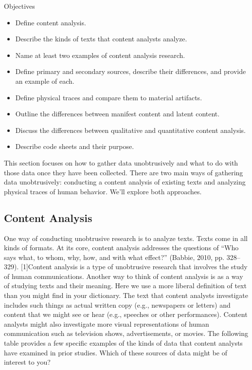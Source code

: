 \begin{center}
	\begin{objbox}{Objectives}
		\begin{itemize}
			\setlength{\itemsep}{0pt}
			\setlength{\parskip}{0pt}
			\setlength{\parsep}{0pt}
			
			\item Define content analysis.
			\item Describe the kinds of texts that content analysts analyze.
			\item Name at least two examples of content analysis research.
			\item Define primary and secondary sources, describe their differences, and provide an example of each.
			\item Define physical traces and compare them to material artifacts.
			\item Outline the differences between manifest content and latent content.
			\item Discuss the differences between qualitative and quantitative content analysis.
			\item Describe code sheets and their purpose.			

		\end{itemize}
	\end{objbox}
\end{center}

This section focuses on how to gather data unobtrusively and what to do with those data once they have been collected. There are two main ways of gathering data unobtrusively: conducting a content analysis of existing texts and analyzing physical traces of human behavior. We’ll explore both approaches.

\subsection{Content Analysis}

One way of conducting unobtrusive research is to analyze texts. Texts come in all kinds of formats. At its core, content analysis addresses the questions of “Who says what, to whom, why, how, and with what effect?” (Babbie, 2010, pp. 328–329). [1]Content analysis is a type of unobtrusive research that involves the study of human communications. Another way to think of content analysis is as a way of studying texts and their meaning. Here we use a more liberal definition of text than you might find in your dictionary. The text that content analysts investigate includes such things as actual written copy (e.g., newspapers or letters) and content that we might see or hear (e.g., speeches or other performances). Content analysts might also investigate more visual representations of human communication such as television shows, advertisements, or movies. The following table provides a few specific examples of the kinds of data that content analysts have examined in prior studies. Which of these sources of data might be of interest to you?


